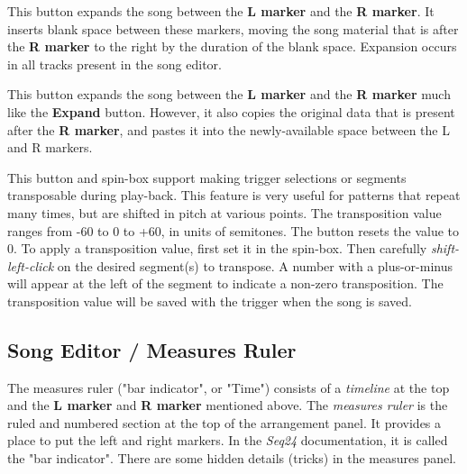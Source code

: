    This button expands the song between the
   \textbf{L marker} and the \textbf{R marker}.
   It inserts blank space between these markers, moving the song material
   that is after the \textbf{R marker}
   to the right by the duration of the blank space.
   Expansion occurs in all tracks present in the song editor.

   This button expands the song between the \textbf{L marker} and the
   \textbf{R marker} much like the \textbf{Expand} button.
   However, it also copies the original data that is present after the
   \textbf{R marker}, and pastes it into the newly-available space between
   the L and R markers.

   This button and spin-box support making trigger selections or segments
   transposable during play-back.  This feature is very useful
   for patterns that repeat many times, but are shifted in pitch at various
   points.
   The transposition value ranges from -60 to 0 to +60, in units of semitones.
   The button resets the value to 0.
   To apply a transposition value, first set it in the spin-box.
   Then carefully \textsl{shift-left-click}
   on the desired segment(s) to transpose.
   A number with a plus-or-minus will appear at the left of the segment to
   indicate a non-zero transposition.
   The transposition value will be saved with the trigger when the song is
   saved.

\subsection{Song Editor / Measures Ruler}
\label{subsec:song_editor_measures_ruler}

   The measures ruler ("bar indicator", or "Time")
   consists of a \textsl{timeline} at the top and the 
   \textbf{L marker} and \textbf{R marker} mentioned above.
   The \textsl{measures ruler} is the ruled and numbered section at the top
   of the arrangement panel.  It provides a place to put the left and right
   markers.  In the \textsl{Seq24} documentation, it is called the "bar
   indicator".
   There are some hidden details (tricks) in the measures panel.

